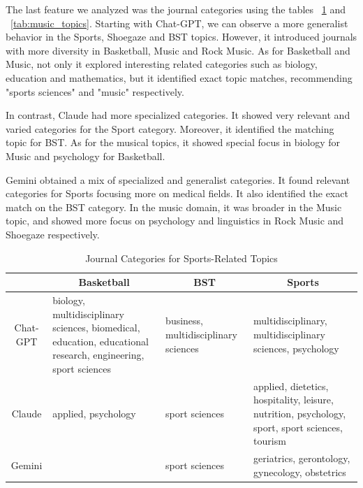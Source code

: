 \documentclass[runningheads]{llncs}
\begin{document}
The last feature we analyzed was the journal categories using the tables ~\ref{tab:sports_topics} and ~\ref{tab:music_topics}. Starting with Chat-GPT, we can observe a more generalist behavior in the Sports, Shoegaze and BST topics. However, it introduced journals with more diversity in Basketball, Music and Rock Music. As for Basketball and Music, not only it explored interesting related categories such as biology, education and mathematics, but it identified exact topic matches, recommending "sports sciences" and "music" respectively.

In contrast, Claude had more specialized categories. It showed very relevant and varied categories for the Sport category. Moreover, it identified the matching topic for BST. As for the musical topics, it showed special focus in biology for Music and psychology for Basketball.

Gemini obtained a mix of specialized and generalist categories. It found relevant categories for Sports focusing more on medical fields. It also identified the exact match on the BST category. In the music domain, it was broader in the Music topic, and showed more focus on psychology and linguistics in Rock Music and Shoegaze respectively.

\begin{table}[ht]
\scriptsize
\centering
\begin{tabular}{|c|p{3cm}|p{3cm}|p{3cm}|}
\hline
 & \multicolumn{1}{c|}{\textbf{Basketball}} & \multicolumn{1}{c|}{\textbf{BST}} & \multicolumn{1}{c|}{\textbf{Sports}} \\ \hline
Chat-GPT & biology, multidisciplinary sciences, biomedical, education, educational research, engineering, sport sciences & business, multidisciplinary sciences & multidisciplinary, multidisciplinary sciences, psychology \\ \hline
Claude & applied, psychology & sport sciences & applied, dietetics, hospitality, leisure, nutrition, psychology, sport, sport sciences, tourism \\ \hline
Gemini &  & sport sciences & geriatrics, gerontology, gynecology, obstetrics \\ \hline
\end{tabular}
\caption{Journal Categories for Sports-Related Topics}
\label{tab:sports_topics}
\end{table}
\end{document}
